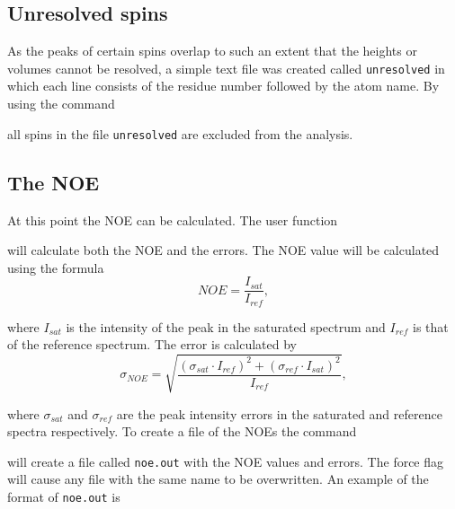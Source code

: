 \subsection{Unresolved spins}

As the peaks of certain spins overlap to such an extent that the heights or volumes cannot be resolved, a simple text file was created called \texttt{unresolved} in which each line consists of the residue number followed by the atom name.  By using the command


all spins in the file \texttt{unresolved} are excluded from the analysis.




\subsection{The NOE}

At this point the NOE can be calculated.  The user function


will calculate both the NOE and the errors.  The NOE value will be calculated using the formula
\begin{equation}
NOE = \frac{I_{sat}}{I_{ref}},
\end{equation}

\noindent where $I_{sat}$ is the intensity of the peak in the saturated spectrum and $I_{ref}$ is that of the reference spectrum.  The error is calculated by
\begin{equation}
\sigma_{NOE} = \sqrt{\frac{(\sigma_{sat} \cdot I_{ref})^2 + (\sigma_{ref} \cdot I_{sat})^2}{I_{ref}}},
\end{equation}

\noindent where $\sigma_{sat}$ and $\sigma_{ref}$ are the peak intensity errors in the saturated and reference spectra respectively.  To create a file of the NOEs the command


will create a file called \texttt{noe.out} with the NOE values and errors.  The force flag will cause any file with the same name to be overwritten.  An example of the format of \texttt{noe.out} is

